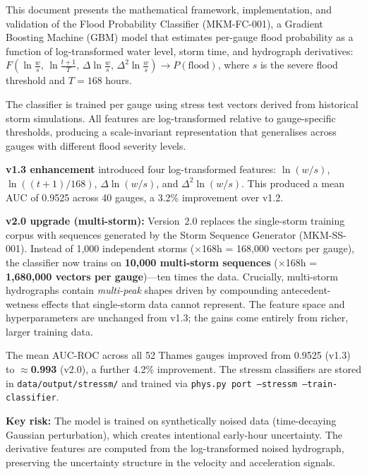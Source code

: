 \documentclass[11pt,a4paper]{article}
\begin{document}
\mkmtitlepage
\mkmlegalpage
\tableofcontents
\clearpage

\mkmexecsummary

This document presents the mathematical framework, implementation, and validation of
the Flood Probability Classifier (MKM-FC-001), a Gradient Boosting Machine (GBM) model
that estimates per-gauge flood probability as a function of log-transformed water level,
storm time, and hydrograph derivatives:
$F\!\left(\ln\tfrac{w}{s},\, \ln\tfrac{t{+}1}{T},\, \Delta\ln\tfrac{w}{s},\,
\Delta^2\ln\tfrac{w}{s}\right) \to P(\text{flood})$,
where $s$ is the severe flood threshold and $T = 168$ hours.

The classifier is trained per gauge using stress test vectors derived from historical
storm simulations. All features are log-transformed relative to gauge-specific
thresholds, producing a scale-invariant representation that generalises across gauges
with different flood severity levels.

\textbf{v1.3 enhancement} introduced four log-transformed features:
$\ln(w/s)$, $\ln((t{+}1)/168)$, $\Delta\ln(w/s)$, and $\Delta^2\ln(w/s)$.
This produced a mean AUC of 0.9525 across 40 gauges, a 3.2\% improvement over v1.2.

\textbf{v2.0 upgrade (multi-storm):} Version~2.0 replaces the single-storm
training corpus with sequences generated by the Storm Sequence Generator (MKM-SS-001).
Instead of 1{,}000 independent storms ($\times$168h = 168{,}000 vectors per gauge),
the classifier now trains on \textbf{10{,}000 multi-storm sequences}
($\times$168h = \textbf{1{,}680{,}000 vectors per gauge})---ten times the data.
Crucially, multi-storm hydrographs contain \emph{multi-peak} shapes driven by
compounding antecedent-wetness effects that single-storm data cannot represent.
The feature space and hyperparameters are unchanged from v1.3; the gains come
entirely from richer, larger training data.

The mean AUC-ROC across all 52 Thames gauges improved from 0.9525 (v1.3) to
\textbf{$\approx$0.993} (v2.0), a further 4.2\% improvement.
The stressm classifiers are stored in \texttt{data/output/stressm/}
and trained via \texttt{phys.py port --stressm --train-classifier}.

\textbf{Key risk:} The model is trained on synthetically noised data (time-decaying
Gaussian perturbation), which creates intentional early-hour uncertainty. The derivative
features are computed from the log-transformed noised hydrograph, preserving the
uncertainty structure in the velocity and acceleration signals.
\end{document}
